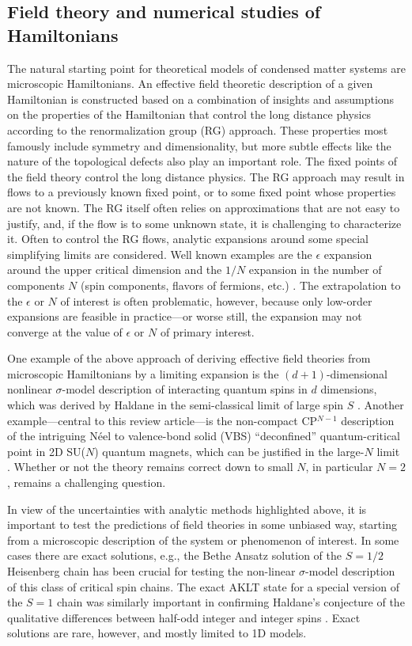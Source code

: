\documentclass[10pt,pre,aps,twocolumn,showpacs,subscriptaddresses,floatfix]{revtex4}
\begin{document}
\subsection{Field theory and numerical studies of Hamiltonians}

The natural starting point for theoretical models of condensed matter systems are microscopic Hamiltonians.
An effective field theoretic description  of a given Hamiltonian 
is constructed based on a combination of insights and assumptions on the properties of the Hamiltonian that control the long distance physics according to the renormalization group (RG) approach. These properties most famously include symmetry and dimensionality, but more subtle effects like the nature of the topological defects also play an important role.  The fixed points of the field theory control the long distance physics.
The RG approach may result in flows to a previously known fixed point, or to some fixed point
whose properties are not known. The RG itself often relies on approximations that are not easy
to justify, and, if the flow is to some unknown state, it is challenging to characterize it. 
Often to control the RG flows, analytic expansions around some special simplifying limits are considered. Well known examples are the $\epsilon$ expansion
around the upper critical dimension and the $1/N$ expansion in the number of components $N$ (spin components, flavors of fermions, etc.)
\cite{herbut2007:book,barber1972:lgNeps}. The
extrapolation to the $\epsilon$ or $N$ of interest is often problematic, however, because only low-order
expansions are feasible in practice---or worse still, the expansion may not converge at the value of $\epsilon$ or $N$ of primary interest.

One example of the above approach of deriving effective field theories from microscopic Hamiltonians by a limiting expansion is the $(d+1)$-dimensional
nonlinear $\sigma$-model description of interacting quantum spins in $d$ dimensions, which was derived by Haldane in 
the semi-classical limit of large spin $S$ \cite{Haldane83,Chakravarty89,Auerbach94}.  Another example---central to this review article---is the 
non-compact CP$^{N-1}$ description of the intriguing  N\'eel to valence-bond solid (VBS) ``deconfined'' quantum-critical point in 2D 
SU($N$) quantum magnets, which can be justified in the large-$N$ limit \cite{Senthil04a,Sachdev08}. Whether or not the theory remains correct down to 
small $N$, in particular $N=2$, remains a challenging question.

In view of the uncertainties with analytic methods highlighted above, it is important to test the predictions of field theories in some unbiased way,
starting from a microscopic description of the system or phenomenon of interest. In some cases there are exact solutions, 
e.g., the Bethe Ansatz solution of the $S=1/2$ Heisenberg chain \cite{Bethe31} has been crucial for testing 
the non-linear $\sigma$-model description of this class of critical spin chains. The exact AKLT state \cite{affleck88} for a special 
version of the $S=1$ chain was similarly important in confirming Haldane's conjecture of the qualitative differences between 
half-odd integer and integer spins \cite{Haldane83}. Exact solutions are rare, however, and mostly limited to 1D models.
 
\end{document}
